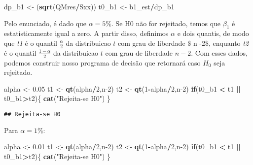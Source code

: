 \documentclass[
]{article}
\newenvironment{Shaded}{\begin{snugshade}}{\end{snugshade}}
\newcommand{\ControlFlowTok}[1]{\textcolor[rgb]{0.13,0.29,0.53}{\textbf{#1}}}
\newcommand{\DecValTok}[1]{\textcolor[rgb]{0.00,0.00,0.81}{#1}}
\newcommand{\FloatTok}[1]{\textcolor[rgb]{0.00,0.00,0.81}{#1}}
\newcommand{\KeywordTok}[1]{\textcolor[rgb]{0.13,0.29,0.53}{\textbf{#1}}}
\newcommand{\NormalTok}[1]{#1}
\newcommand{\OperatorTok}[1]{\textcolor[rgb]{0.81,0.36,0.00}{\textbf{#1}}}
\newcommand{\StringTok}[1]{\textcolor[rgb]{0.31,0.60,0.02}{#1}}
\begin{document}
\begin{Shaded}
\begin{Highlighting}[]
\NormalTok{dp_b1 <-}\StringTok{ }\NormalTok{(}\KeywordTok{sqrt}\NormalTok{(QMres}\OperatorTok{/}\NormalTok{Sxx))}
\NormalTok{t0_b1 <-}\StringTok{ }\NormalTok{b1_est}\OperatorTok{/}\NormalTok{dp_b1}
\end{Highlighting}
\end{Shaded}

Pelo enunciado, é dado que \(\alpha= 5\%\). Se H0 não for rejeitado,
temos que \(\beta_1\) é estatisticamente igual a zero. A partir disso,
definimos \(\alpha\) e dois quantis, de modo que \emph{t1} é o quantil
\(\frac{\alpha}{2}\) da distribuicao \(t\) com grau de liberdade \$ n
-2\$, enquanto \emph{t2} é o quantil \(\frac{1-\alpha}{2}\) da
distribuicao \(t\) com grau de liberdade \(n -2\). Com esses dados,
podemos construir nosso programa de decisão que retornará caso \(H_0\)
seja rejeitado.

\begin{Shaded}
\begin{Highlighting}[]
\NormalTok{alpha <-}\StringTok{ }\FloatTok{0.05}
\NormalTok{t1 <-}\StringTok{ }\KeywordTok{qt}\NormalTok{(alpha}\OperatorTok{/}\DecValTok{2}\NormalTok{,n}\DecValTok{-2}\NormalTok{)}
\NormalTok{t2 <-}\StringTok{ }\KeywordTok{qt}\NormalTok{(}\DecValTok{1}\OperatorTok{-}\NormalTok{alpha}\OperatorTok{/}\DecValTok{2}\NormalTok{,n}\DecValTok{-2}\NormalTok{)}
\ControlFlowTok{if}\NormalTok{(t0_b1 }\OperatorTok{<}\StringTok{ }\NormalTok{t1 }\OperatorTok{||}\StringTok{ }\NormalTok{t0_b1}\OperatorTok{>}\NormalTok{t2)\{}
  \KeywordTok{cat}\NormalTok{(}\StringTok{"Rejeita-se H0"}\NormalTok{)}
\NormalTok{\}}
\end{Highlighting}
\end{Shaded}

\begin{verbatim}
## Rejeita-se H0
\end{verbatim}

Para \(\alpha= 1\%\):

\begin{Shaded}
\begin{Highlighting}[]
\NormalTok{alpha <-}\StringTok{ }\FloatTok{0.01}
\NormalTok{t1 <-}\StringTok{ }\KeywordTok{qt}\NormalTok{(alpha}\OperatorTok{/}\DecValTok{2}\NormalTok{,n}\DecValTok{-2}\NormalTok{)}
\NormalTok{t2 <-}\StringTok{ }\KeywordTok{qt}\NormalTok{(}\DecValTok{1}\OperatorTok{-}\NormalTok{alpha}\OperatorTok{/}\DecValTok{2}\NormalTok{,n}\DecValTok{-2}\NormalTok{)}
\ControlFlowTok{if}\NormalTok{(t0_b1 }\OperatorTok{<}\StringTok{ }\NormalTok{t1 }\OperatorTok{||}\StringTok{ }\NormalTok{t0_b1}\OperatorTok{>}\NormalTok{t2)\{}
  \KeywordTok{cat}\NormalTok{(}\StringTok{"Rejeita-se H0"}\NormalTok{)}
\NormalTok{\}}
\end{Highlighting}
\end{Shaded}
\end{document}
